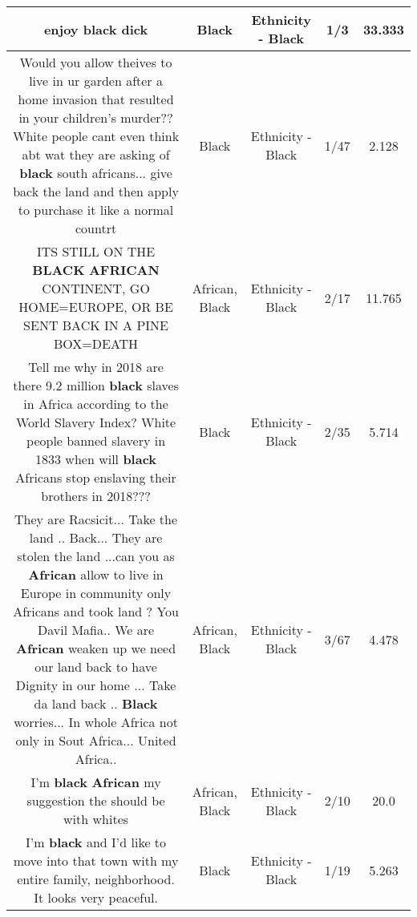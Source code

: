 \documentclass[11pt]{article}
\newlength\mylength
\begin{document}
\begin{center}
\begin{longtable}{|C{.65\mylength}|C{.30\mylength}|C{.12\mylength}|C{.12\mylength}|C{.12\mylength}|}
  \small enjoy \textbf{black} dick\normalsize   & Black & Ethnicity - Black & 1/3 & 33.333 \\  \hline
  \small Would you allow theives to live in ur garden after a home invasion that resulted in your children's murder?? White people cant even think abt wat they are asking of \textbf{black} south africans... give back the land and then apply to purchase it like a normal countrt\normalsize   & Black & Ethnicity - Black & 1/47 & 2.128 \\  \hline
  \small ITS STILL ON THE \textbf{BLACK} \textbf{AFRICAN} CONTINENT, GO HOME=EUROPE, OR BE SENT BACK IN A PINE BOX=DEATH\normalsize   & African, Black & Ethnicity - Black & 2/17 & 11.765 \\  \hline
  \small Tell me why in 2018 are there 9.2 million \textbf{black} slaves in Africa according to the World Slavery Index? White people banned slavery in 1833 when will \textbf{black} Africans stop enslaving their brothers in 2018???\normalsize   & Black & Ethnicity - Black & 2/35 & 5.714 \\  \hline
  \small They are Racsicit... Take the land .. Back... They are stolen the land ...can you as \textbf{African} allow to live in Europe in community only Africans and took land ? You Davil Mafia.. We are \textbf{African} weaken up we need our land back to have Dignity in our home ... Take da land back .. \textbf{Black} worries... In whole Africa not only in Sout Africa... United Africa..\normalsize   & African, Black & Ethnicity - Black & 3/67 & 4.478 \\  \hline
  \small I'm \textbf{black} \textbf{African} my suggestion the should be with whites\normalsize   & African, Black & Ethnicity - Black & 2/10 & 20.0 \\  \hline
  \small I'm \textbf{black} and I'd like to move into that town with my entire family, neighborhood. It looks very peaceful.\normalsize   & Black & Ethnicity - Black & 1/19 & 5.263 \\  \hline

\end{longtable}
\end{center}
\end{document}
